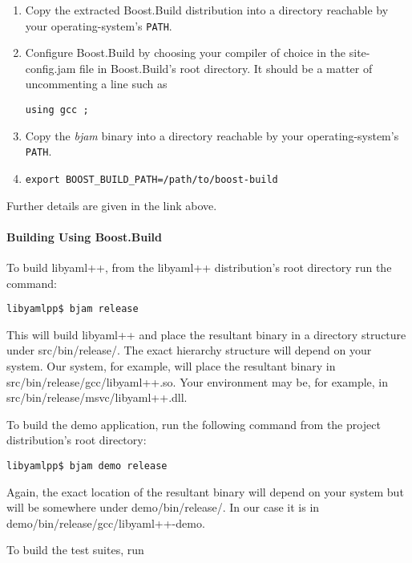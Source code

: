 \documentclass{article}
\begin{document}
\begin{enumerate}
  \item Copy the extracted Boost.Build distribution into a directory reachable by
    your operating-system's \texttt{PATH}.
  \item Configure Boost.Build by choosing your compiler of choice in the
    site-config.jam file in Boost.Build's root directory.  It should be a
    matter of uncommenting a line such as

   \begin{verbatim}using gcc ;\end{verbatim}

  \item Copy the \emph{bjam} binary into a directory reachable by your
    operating-system's \texttt{PATH}.
  \item \texttt{export BOOST\_BUILD\_PATH=/path/to/boost-build}
\end{enumerate}

Further details are given in the link above.

\paragraph{Building Using Boost.Build}

To build libyaml++, from the libyaml++ distribution's root directory run the
command:

\begin{verbatim}
libyamlpp$ bjam release
\end{verbatim}

This will build libyaml++ and place the resultant binary in a directory
structure under src/bin/release/.  The exact hierarchy structure will depend on
your system.  Our system, for example, will place the resultant binary in
src/bin/release/gcc/libyaml++.so.  Your environment may be, for example, in
src/bin/release/msvc/libyaml++.dll.

To build the demo application, run the following command from the project
distribution's root directory:

\begin{verbatim}
libyamlpp$ bjam demo release
\end{verbatim}

Again, the exact location of the resultant binary will depend on your system
but will be somewhere under demo/bin/release/.  In our case it is in
demo/bin/release/gcc/libyaml++-demo.

To build the test suites, run
\end{document}
